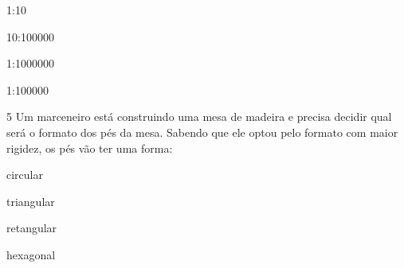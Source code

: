 \begin{escolha}
\item 1:10
\item 10:100000
\item 1:1000000
\item 1:100000
\end{escolha}



\num{5} Um marceneiro está construindo uma mesa de madeira e precisa decidir
qual será o formato dos pés da mesa. Sabendo que ele optou pelo formato
com maior rigidez, os pés vão ter uma forma:

\begin{escolha}
\item circular
\item triangular
\item retangular
\item hexagonal
\end{escolha}


